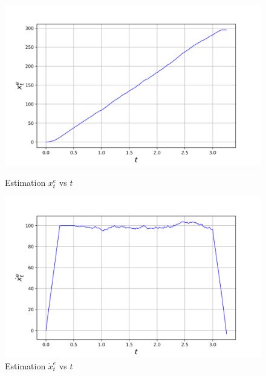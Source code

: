 \begin{figure}[H]
    \centering
    \begin{minipage}{0.49\linewidth}
        \centering
        \includegraphics[width=\linewidth]{plots/part1-b.1.png}
        \caption{Estimation $x^e_t$ vs $t$}
    \end{minipage}
    \hfill
    \begin{minipage}{0.49\linewidth}
        \centering
        \includegraphics[width=\linewidth]{plots/part1-b.2.png}
        \caption{Estimation $\dot{x}^e_t$ vs $t$}
    \end{minipage}
\end{figure}

